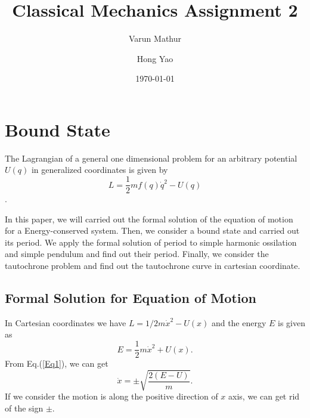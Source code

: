 \documentclass[%
 reprint,
 amsmath,amssymb,
 aps,
]{revtex4-1}
\begin{document}

\title{Classical Mechanics Assignment 2}

\author{Varun Mathur}

\author{Hong Yao}%
 
%



\date{\today}%


\maketitle


\section{\label{sec:level1}Bound State}
The Lagrangian of a general one dimensional problem for an arbitrary potential $U(q)$ in generalized coordinates is given by
\begin{equation}
    L=\frac{1}{2}mf(q)\dot{q}^2-U(q)
\end{equation}.

In this paper, we will carried out the formal solution of the equation of motion for a Energy-conserved system. Then, we consider a bound state and carried out its period. We apply the formal solution of period  to simple harmonic ossilation and simple pendulum and find out their period. Finally, we consider the tautochrone problem and find out the tautochrone curve in cartesian coordinate. 


\subsection{\label{sec:level2}Formal Solution for Equation of Motion}
In Cartesian coordinates we have $L=1/2m\dot{x}^2-U(x)$ and the energy $E$ is given as
\begin{equation}
    E=\frac{1}{2}m\dot{x}^2+U(x).
\label{Eq1}
\end{equation}
From Eq.(\ref{Eq1}), we can get
\begin{equation}
    \dot{x}=\pm\sqrt{\frac{2(E-U)}{m}}.
\end{equation}
If we consider the motion is along the positive direction of $x$ axis, we can get rid of the sign $\pm$.
\end{document}
